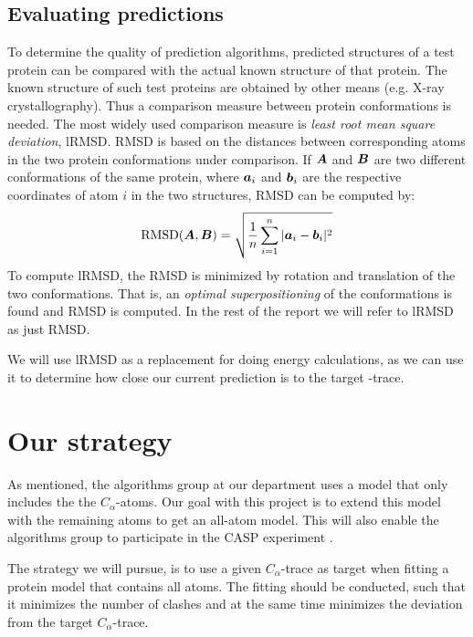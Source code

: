 \subsection{Evaluating predictions}
\label{sec:eval-predictions}
To determine the quality of prediction algorithms, predicted
structures of a test protein can be compared with the actual known
structure of that protein. The known structure of such test proteins
are obtained by other means (e.g. X-ray crystallography).  Thus a
comparison measure between protein conformations is needed. The most
widely used comparison measure is \textit{least root mean square
  deviation}, lRMSD. RMSD is based on the distances between
corresponding atoms in the two protein conformations under comparison.
If $\boldsymbol{A}$ and $\boldsymbol{B}$ are two different conformations of the same
protein, where $\boldsymbol{a}_i$ and $\boldsymbol{b}_i$ are the respective
coordinates of atom $i$ in the two structures, RMSD can be computed
by:
\begin{equation}
  \label{eq:rmsd}
  \text{RMSD}(\boldsymbol{A}, \boldsymbol{B}) = \sqrt{\frac{1}{n}\sum_{i=1}^n |\boldsymbol{a}_i - \boldsymbol{b}_i|^2}
\end{equation}
To compute lRMSD, the RMSD is minimized by rotation and
translation of the two conformations. That is, an
\textit{optimal superpositioning} of the conformations is found and
RMSD is computed. In the rest of the report we will refer to lRMSD as
just RMSD.

We will use lRMSD as a replacement for doing energy calculations, as
we can use it to determine how close our current prediction is to the
target \Ca-trace.



\section{Our strategy}
As mentioned, the algorithms group at our department uses a model that
only includes the the $C_\alpha$-atoms. Our goal with this project is
to extend this model with the remaining atoms to get an all-atom
model.  This will also enable the algorithms group to participate in
the CASP experiment \cite{caspwebsite}.

The strategy we will pursue, is to use a given $C_\alpha$-trace as target when fitting a
protein model that contains all atoms. The fitting should be conducted,
such that it minimizes the number of clashes and at the same time
minimizes the deviation from the target $C_\alpha$-trace.


